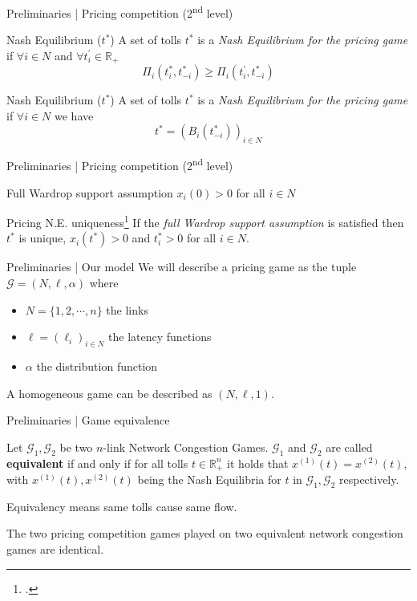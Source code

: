 \documentclass{beamer}
\newcommand{\R}{\mathbb{R}}
\newcommand{\Gm}{\mathcal{G}}
\begin{document}
\begin{frame}{Preliminaries | Pricing competition (2\textsuperscript{nd} level)}
	\begin{block}{Nash Equilibrium ($t^*$)}
		A set of tolls $t^*$ is a \textit{Nash Equilibrium for the pricing game} if $\forall i \in N$ and $\forall t_i^\prime \in \R_+$
		\[\Pi_i(t_i^*, t_{-i}^*) \geq \Pi_i(t_i^\prime, t_{-i}^*)\]
	\end{block}
	\begin{block}{Nash Equilibrium ($t^*$)}
		A set of tolls $t^*$ is a \textit{Nash Equilibrium for the pricing game} if
		$\forall i \in N$ we have
		\[t^* = (B_i(t_{-i}^*))_{i \in N}\]
	\end{block}
\end{frame}

\begin{frame}{Preliminaries | Pricing competition (2\textsuperscript{nd} level)}
	\begin{block}{Full Wardrop support assumption}
		$x_i(0) > 0$ for all $i \in N$
	\end{block}
	\begin{block}{Pricing N.E. uniqueness\footcite{Harks_2019}}
		If the \textit{full Wardrop support assumption} is satisfied then $t^*$ is unique, $x_i(t^*) > 0$ and $t_i^* > 0$ for all $i \in N$.
	\end{block}
\end{frame}

\begin{frame}{Preliminaries | Our model}
	We will describe a pricing game as the tuple $\Gm = (N, \ell, \alpha)$ where
	\begin{itemize}
		\item $N = \{1, 2, \cdots, n\}$ the links
		\item $\ell = (\ell_i)_{i \in N}$ the latency functions
		\item $\alpha$ the distribution function
	\end{itemize}\pause
	A homogeneous game can be described as $(N, \ell, 1)$.
\end{frame}

\begin{frame}{Preliminaries | Game equivalence}
	\begin{definition}
		Let $\Gm_1, \Gm_2$ be two $n$-link Network Congestion Games.
		$\Gm_1$ and $\Gm_2$ are called \textbf{equivalent} if and only if for all tolls $t \in \R_+^n$ it holds that $x^{(1)}(t) = x^{(2)}(t)$, with $x^{(1)}(t), x^{(2)}(t)$ being the Nash Equilibria for $t$ in $\Gm_1, \Gm_2$ respectively.
	\end{definition}
	Equivalency means same tolls cause same flow.\pause

	The two pricing competition games played on two equivalent network congestion games are identical.
\end{frame}
\end{document}
